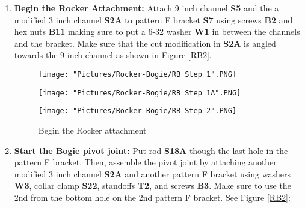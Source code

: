 \documentclass[12pt]{article}
\begin{document}
\begin{enumerate}
\item \textbf{Begin the Rocker Attachment:}  Attach 9 inch channel \textbf{S5} and the a modified 3 inch channel \textbf{S2A} to pattern F bracket \textbf{S7} using screws \textbf{B2} and hex nuts \textbf{B11} making sure to put a 6-32 washer \textbf{W1} in between the channels and the bracket. Make sure that the cut modification in \textbf{S2A} is angled towards the 9 inch channel as shown in Figure \ref {RB2}.

\begin{figure}[H]
  	\centering
  	\begin{minipage}[b]{0.30\textwidth}
    		\texttt{[image: "Pictures/Rocker-Bogie/RB Step 1".PNG]}
  	\end{minipage}
  	\hfill
  	\begin{minipage}[b]{0.30\textwidth}
    		\texttt{[image: "Pictures/Rocker-Bogie/RB Step 1A".PNG]}
  	\end{minipage}
    	\hfill
  	\begin{minipage}[b]{0.30\textwidth}
    		\texttt{[image: "Pictures/Rocker-Bogie/RB Step 2".PNG]}
  	\end{minipage}
  	\caption{Begin the Rocker attachment}
\end{figure}



\item \textbf{Start the Bogie pivot joint:} Put rod \textbf{S18A} though the last hole in the pattern F bracket. Then,  assemble the pivot joint by attaching another modified 3 inch channel \textbf{S2A} and another pattern F bracket using washers \textbf{W3}, collar clamp \textbf{S22}, standoffs \textbf{T2}, and screws \textbf{B3}. Make sure to use the 2nd from the bottom hole on the 2nd pattern F bracket. See Figure \ref{RB2}:



\end{enumerate}
\end{document}
